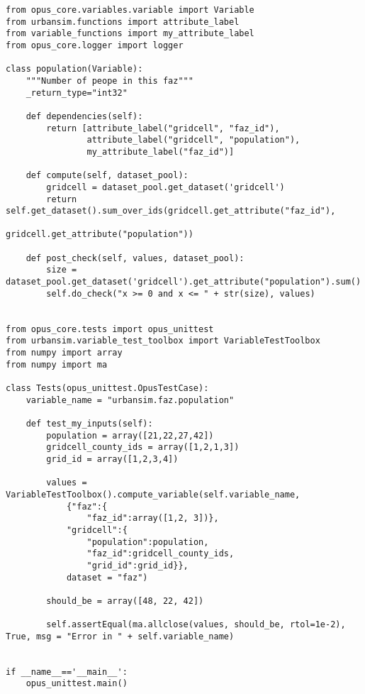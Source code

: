 \variablesindex\attributesindex\numpyindex
\begin{verbatim}
from opus_core.variables.variable import Variable
from urbansim.functions import attribute_label
from variable_functions import my_attribute_label
from opus_core.logger import logger

class population(Variable):
    """Number of peope in this faz"""
    _return_type="int32"

    def dependencies(self):
        return [attribute_label("gridcell", "faz_id"), 
                attribute_label("gridcell", "population"), 
                my_attribute_label("faz_id")]

    def compute(self, dataset_pool):
        gridcell = dataset_pool.get_dataset('gridcell')
        return self.get_dataset().sum_over_ids(gridcell.get_attribute("faz_id"), 
                                   gridcell.get_attribute("population"))

    def post_check(self, values, dataset_pool):
        size = dataset_pool.get_dataset('gridcell').get_attribute("population").sum()
        self.do_check("x >= 0 and x <= " + str(size), values)
    

from opus_core.tests import opus_unittest
from urbansim.variable_test_toolbox import VariableTestToolbox
from numpy import array
from numpy import ma

class Tests(opus_unittest.OpusTestCase):
    variable_name = "urbansim.faz.population"
 
    def test_my_inputs(self):
        population = array([21,22,27,42]) 
        gridcell_county_ids = array([1,2,1,3]) 
        grid_id = array([1,2,3,4])
        
        values = VariableTestToolbox().compute_variable(self.variable_name, 
            {"faz":{
                "faz_id":array([1,2, 3])}, 
            "gridcell":{ 
                "population":population,
                "faz_id":gridcell_county_ids, 
                "grid_id":grid_id}}, 
            dataset = "faz")

        should_be = array([48, 22, 42])
        
        self.assertEqual(ma.allclose(values, should_be, rtol=1e-2), True, msg = "Error in " + self.variable_name)


if __name__=='__main__':
    opus_unittest.main()
\end{verbatim}

